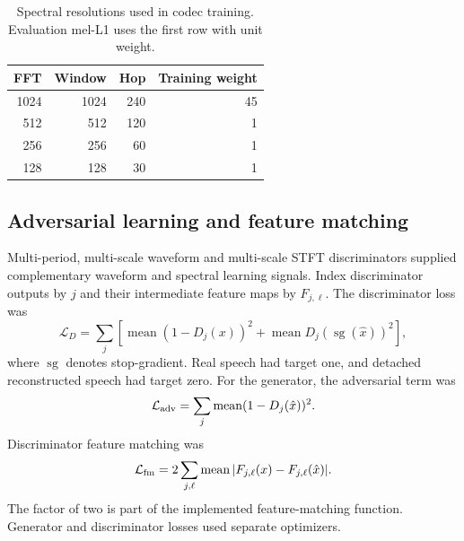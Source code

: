 \begin{table}[t]
\centering
\caption{Spectral resolutions used in codec training. Evaluation mel-L1 uses the first row with unit weight.}
\label{tab:sv2-mels}
\small
\begin{tabular}{@{}rrrr@{}}
\toprule
FFT & Window & Hop & Training weight\\
\midrule
1024 & 1024 & 240 & 45\\
512 & 512 & 120 & 1\\
256 & 256 & 60 & 1\\
128 & 128 & 30 & 1\\
\bottomrule
\end{tabular}
\end{table}

\subsection{Adversarial learning and feature matching}
Multi-period, multi-scale waveform and multi-scale STFT discriminators supplied complementary waveform and spectral learning signals. Index discriminator outputs by $j$ and their intermediate feature maps by $F_{j,\ell}$. The discriminator loss was
\begin{equation}
 \mathcal L_D=\sum_j\left[
  \operatorname{mean}(1-D_j(x))^2
  +\operatorname{mean}D_j(\operatorname{sg}(\hat x))^2
 \right],
 \label{eq:sv2-disc}
\end{equation}
where $\operatorname{sg}$ denotes stop-gradient. Real speech had target one, and detached reconstructed speech had target zero. For the generator, the adversarial term was
\begin{equation}
 \mathcal L_{\rm adv}
 =\sum_j\operatorname{mean}(1-D_j(\hat x))^2.
 \label{eq:sv2-adv}
\end{equation}
Discriminator feature matching was
\begin{equation}
 \mathcal L_{\rm fm}
 =2\sum_{j,\ell}\operatorname{mean}
   |F_{j,\ell}(x)-F_{j,\ell}(\hat x)|.
 \label{eq:sv2-fm}
\end{equation}
The factor of two is part of the implemented feature-matching function. Generator and discriminator losses used separate optimizers.

